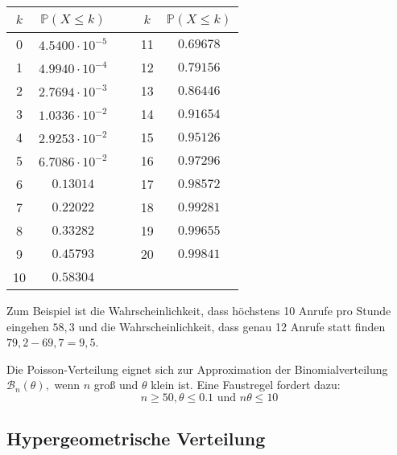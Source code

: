 {\begin{bsp}
    \begin{center}
        \begin{tabular}{|cc|c|cc|}
            \hline
            $k$ & $\mathbb P(X\leq k)$ & ~ & $k$ & $\mathbb P(X\leq k)$ \\
            \hline
            0   & $4.5400 \cdot 10^{-5}$ & ~ & 11  & $0.69678$            \\
            1   & $4.9940 \cdot 10^{-4}$ & ~ & 12  & $0.79156$            \\
            2   & $2.7694 \cdot 10^{-3}$ & ~ & 13  & $0.86446$            \\
            3   & $1.0336 \cdot 10^{-2}$ & ~ & 14  & $0.91654$            \\
            4   & $2.9253 \cdot 10^{-2}$ & ~ & 15  & $0.95126$            \\
            5   & $6.7086 \cdot 10^{-2}$ & ~ & 16  & $0.97296$            \\
            6   & $0.13014             $ & ~ & 17  & $0.98572$            \\
            7   & $0.22022             $ & ~ & 18  & $0.99281$            \\
            8   & $0.33282             $ & ~ & 19  & $0.99655$            \\
            9   & $0.45793             $ & ~ & 20  & $0.99841$            \\
            10  & $0.58304             $ & ~ & ~   & ~                    \\
            \hline
        \end{tabular}
    \end{center}

    Zum Beispiel ist die Wahrscheinlichkeit, dass höchstens 10 Anrufe pro
    Stunde eingehen $58,3$ und die Wahrscheinlichkeit, dass genau 12 Anrufe statt finden
    $79,2-69,7=9,5$.

    \end{bsp}

    \begin{satz}
    Die Poisson-Verteilung eignet sich zur Approximation der
    Binomialverteilung $\mathcal B_{n}\left(\theta\right),$ wenn $n$ groß und 
    $\theta $ klein ist. Eine Faustregel fordert dazu:
    \[n\ge 50,\theta \le 0.1\text{ und }n\theta\le 10\]
    \end{satz}
    
    \bigskip


    \subsection{Hypergeometrische Verteilung}
    \label{sec:hypergeometrische_verteilung}


}
